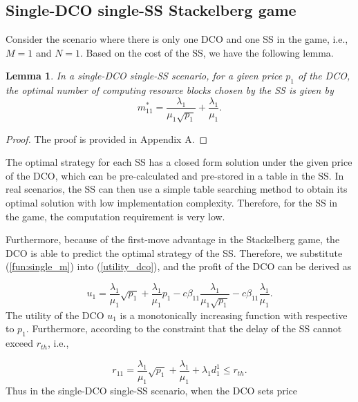\documentclass[twocolumn,10pt]{IEEEtran}
\newtheorem{lemma}{Lemma}
\newtheorem{proof}{Proof}
\begin{document}
\subsection{Single-DCO single-SS Stackelberg game}

Consider the scenario where there is only one DCO and one SS in the game, i.e., $M=1$ and $N=1$. Based on the cost of the SS, we have the following lemma.


\begin{lemma} \label{theorem1}
In a single-DCO single-SS scenario, for a given price $p_1$ of the DCO, the optimal number of computing resource blocks chosen by the SS is given by
\begin{equation}
    m_{11}^*=\frac{{{\lambda _{1}}}}{{{\mu _1}\sqrt {{p_1}} }} + \frac{{{\lambda _{1}}}}{{{\mu _1}}}.
\end{equation}\label{fun:single_m}
\end{lemma}

\begin{proof}
The proof is provided in Appendix A.
\end{proof}

The optimal strategy for each SS has a closed form solution under the given price of the DCO, which can be pre-calculated and pre-stored in a table in the SS. In real scenarios, the SS can then use a simple table searching method to obtain its optimal solution with low implementation complexity. Therefore, for the SS in the game, the computation requirement is very low.

Furthermore, because of the first-move advantage in the Stackelberg game, the DCO is able to predict the optimal strategy of the SS. Therefore, we substitute (\ref{fun:single_m}) into (\ref{utility_dco}), and the profit of the DCO can be derived as

\begin{equation}
    u_{1}=\frac{{{\lambda _{1}}}}{{{\mu _1}}}\sqrt {{p_1}}  + \frac{{{\lambda _{1}}}}{{{\mu _1}}}{p_1} - {c}{\beta _{11}}\frac{{{\lambda _{1}}}}{{{\mu _1}\sqrt {{p_1}} }} - {c}{\beta _{11}}\frac{{{\lambda _{1}}}}{{{\mu _1}}}.
\end{equation}
The utility of the DCO $u_{1}$ is a monotonically increasing function with respective to $p_1$. Furthermore, according to the constraint that the delay of the SS cannot exceed $r_{th}$, i.e.,

\begin{equation}
        {r_{11}}=\frac{{{\lambda _{1}}}}{{{\mu _1}}}\sqrt {{p_1}}  + \frac{{{\lambda _{1}}}}{{{\mu _1}}} + {\lambda _{1}}{d^1_{1}} \leqslant {r_{th}}.
\end{equation}
Thus in the single-DCO single-SS scenario, when the DCO sets price
\end{document}
